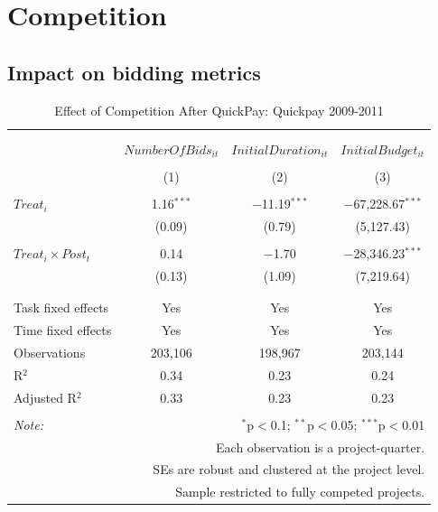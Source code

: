 \documentclass[
]{article}
\begin{document}
\hypertarget{competition}{%
\section{Competition}\label{competition}}

\hypertarget{impact-on-bidding-metrics}{%
\subsection{Impact on bidding metrics}\label{impact-on-bidding-metrics}}

\begin{table}[H] \centering 
  \caption{Effect of Competition After QuickPay: Quickpay 2009-2011} 
  \label{} 
\small 
\begin{tabular}{@{\extracolsep{0pt}}lccc} 
\\[-1.8ex]\hline 
\hline \\[-1.8ex] 
\\[-1.8ex] & $NumberOfBids_{it}$ & $InitialDuration_{it}$ & $InitialBudget_{it}$ \\ 
\\[-1.8ex] & (1) & (2) & (3)\\ 
\hline \\[-1.8ex] 
 $Treat_i$ & 1.16$^{***}$ & $-$11.19$^{***}$ & $-$67,228.67$^{***}$ \\ 
  & (0.09) & (0.79) & (5,127.43) \\ 
  & & & \\ 
 $Treat_i \times Post_t$ & 0.14 & $-$1.70 & $-$28,346.23$^{***}$ \\ 
  & (0.13) & (1.09) & (7,219.64) \\ 
  & & & \\ 
\hline \\[-1.8ex] 
Task fixed effects & Yes & Yes & Yes \\ 
Time fixed effects & Yes & Yes & Yes \\ 
Observations & 203,106 & 198,967 & 203,144 \\ 
R$^{2}$ & 0.34 & 0.23 & 0.24 \\ 
Adjusted R$^{2}$ & 0.33 & 0.23 & 0.23 \\ 
\hline 
\hline \\[-1.8ex] 
\textit{Note:}  & \multicolumn{3}{r}{$^{*}$p$<$0.1; $^{**}$p$<$0.05; $^{***}$p$<$0.01} \\ 
 & \multicolumn{3}{r}{Each observation is a project-quarter.} \\ 
 & \multicolumn{3}{r}{SEs are robust and clustered at the project level.} \\ 
 & \multicolumn{3}{r}{Sample restricted to fully competed projects.} \\ 
\end{tabular} 
\end{table}
\end{document}

